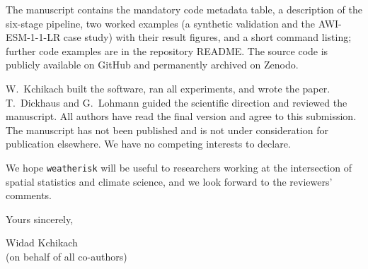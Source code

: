 \documentclass[a4paper,12pt]{article}
\begin{document}
\bigskip
The manuscript contains the mandatory code metadata table, a
description of the six-stage pipeline, two worked examples (a
synthetic validation and the AWI-ESM-1-1-LR case study) with their
result figures, and a short command listing; further code examples
are in the repository README. The source code is publicly available
on GitHub and permanently archived on Zenodo.

\bigskip
W.~Kchikach built the software, ran all experiments, and wrote the
paper. T.~Dickhaus and G.~Lohmann guided the scientific direction and
reviewed the manuscript. All authors have read the final version and
agree to this submission. The manuscript has not been published and is
not under consideration for publication elsewhere. We have no
competing interests to declare.

\bigskip
We hope \texttt{weatherisk} will be useful to researchers working at
the intersection of spatial statistics and climate science, and we
look forward to the reviewers' comments.

\bigskip\bigskip
\noindent
Yours sincerely,

\bigskip\bigskip
\noindent
Widad Kchikach\\
(on behalf of all co-authors)
\end{document}
